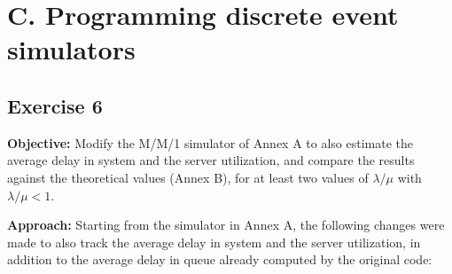 \documentclass[12pt]{article}
\begin{document}
\section{C. Programming discrete event simulators}

\subsection{Exercise 6}

\textbf{Objective:} Modify the M/M/1 simulator of Annex A to also estimate the average delay in system and the server utilization, and compare the results against the theoretical values (Annex B), for at least two values of $\lambda/\mu$ with $\lambda/\mu < 1$.

\textbf{Approach:} Starting from the simulator in Annex A, the following changes were made to also track the average delay in system and the server utilization, in addition to the average delay in queue already computed by the original code:
\end{document}
